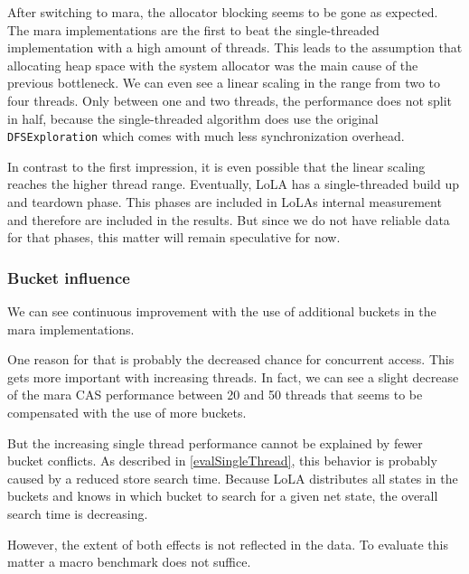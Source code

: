 After switching to mara, the allocator blocking seems to be gone as expected. The mara implementations are the first to beat the single-threaded implementation with a high amount of threads. This leads to the assumption that allocating heap space with the system allocator was the main cause of the previous bottleneck. We can even see a linear scaling in the range from two to four threads. Only between one and two threads, the performance does not split in half, because the single-threaded algorithm does use the original \texttt{DFSExploration} which comes with much less synchronization overhead.

In contrast to the first impression, it is even possible that the linear scaling reaches the higher thread range. Eventually, LoLA has a single-threaded build up and teardown phase. This phases are included in LoLAs internal measurement and therefore are included in the results. But since we do not have reliable data for that phases, this matter will remain speculative for now.

\subsubsection{Bucket influence}
We can see continuous improvement with the use of additional buckets in the mara implementations. 

One reason for that is probably the decreased chance for concurrent access. This gets more important with increasing threads. In fact, we can see a slight decrease of the mara CAS performance between 20 and 50 threads that seems to be compensated with the use of more buckets.

But the increasing single thread performance cannot be explained by fewer bucket conflicts. As described in \ref{evalSingleThread}, this behavior is probably caused by a reduced store search time. Because LoLA distributes all states in the buckets and knows in which bucket to search for a given net state, the overall search time is decreasing.

However, the extent of both effects is not reflected in the data. To evaluate this matter a macro benchmark does not suffice.
